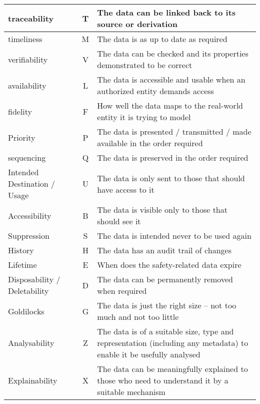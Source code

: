 \begin{longtable}{|L{}|C{}|L{}|}
  {\Gls{traceability}} & T & {The data can be linked back to its source or derivation}\\\hline
  {\Gls{timeliness}} & M & {The data is as up to date as required}\\\hline
  {\Gls{verifiability}} & V & {The data can be checked and its properties demonstrated to be correct}\\\hline
  {\Gls{availability}} & L & {The data is accessible and usable when an authorized entity demands access}\\\hline
  {\Gls{fidelity}} & F & {How well the data maps to the real-world entity it is trying to model}\\\hline
  {Priority} & P & {The data is presented / transmitted / made available in the order required}\\\hline
  {\Gls{sequencing}} & Q & {The data is preserved in the order required}\\\hline
  {Intended Destination / Usage} & U & {The data is only sent to those that should have
  access to
  it}\\\hline
  {Accessibility} & B & {The data is visible only to those that should see it}\\\hline
  {Suppression} & S & {The data is intended never to be used again}\\\hline
  {History} & H & {The data has an audit trail of changes}\\\hline
  {Lifetime} & E & {When does the safety-related data expire}\\\hline
  {Disposability / Deletability} & D & {The data can be permanently removed when required}\\\hline
  {Goldilocks} & G & {The data is just the right size -- not too much and not too little}\\\hline
  {Analysability} & Z & {The data is of a suitable size, type and representation (including any \gls{metadata}) to enable it be usefully analysed}\\\hline
  {Explainability} & X & {The data can be meaningfully explained to those who need to understand it by a suitable mechanism}\\\hline
\end{longtable}

